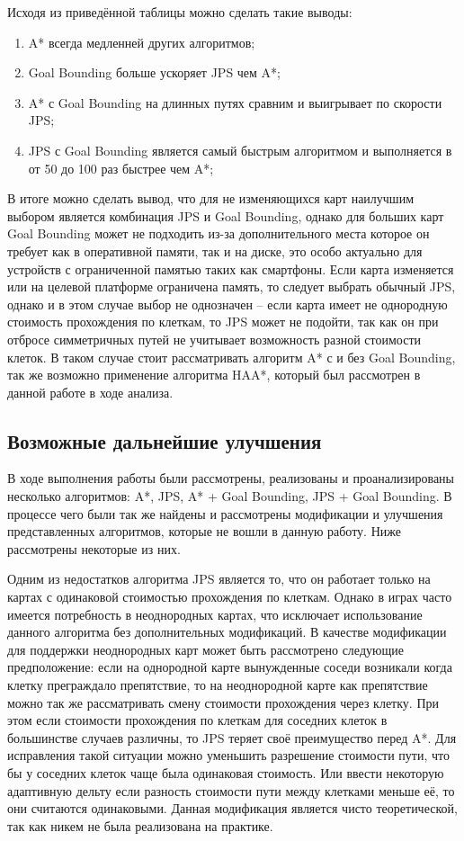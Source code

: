 Исходя из приведённой таблицы можно сделать такие выводы:

\begin{enumerate}
	\item A* всегда медленней других алгоритмов;
	\item Goal Bounding больше ускоряет JPS чем A*;
	\item A* с Goal Bounding на длинных путях сравним и выигрывает по скорости JPS;
	\item JPS с Goal Bounding является самый быстрым алгоритмом и выполняется в от 50 до 100 раз быстрее чем A*; 
\end{enumerate}

В итоге можно сделать вывод, что для не изменяющихся карт наилучшим выбором является комбинация JPS и Goal Bounding, однако для больших карт Goal Bounding может не подходить из-за дополнительного места которое он требует как в оперативной памяти, так и на диске, это особо актуально для устройств с ограниченной памятью таких как смартфоны. Если карта изменяется или на целевой платформе ограничена память, то следует выбрать обычный JPS, однако и в этом случае выбор не однозначен -- если карта имеет не однородную стоимость прохождения по клеткам, то JPS может не подойти, так как он при отбросе симметричных путей не учитывает возможность разной стоимости клеток. В таком случае стоит рассматривать алгоритм A* с и без Goal Bounding, так же возможно применение алгоритма HAA*, который был рассмотрен в данной работе в ходе анализа.  



\subsection{Возможные дальнейшие улучшения}

В ходе выполнения работы были рассмотрены, реализованы и проанализированы несколько алгоритмов: A*, JPS, A* + Goal Bounding, JPS + Goal Bounding. В процессе чего были так же найдены и рассмотрены модификации и улучшения представленных алгоритмов, которые не вошли в данную работу. Ниже рассмотрены некоторые из них.

Одним из недостатков алгоритма JPS является то, что он работает только на картах с одинаковой стоимостью прохождения по клеткам. Однако в играх часто имеется потребность в неоднородных картах, что исключает использование данного алгоритма без дополнительных модификаций. В качестве модификации для поддержки неоднородных карт может быть рассмотрено следующие предположение: если на однородной карте вынужденные соседи возникали когда клетку преграждало препятствие, то на неоднородной карте как препятствие можно так же рассматривать смену стоимости прохождения через клетку. При этом если стоимости прохождения по клеткам для соседних клеток в большинстве случаев различны, то JPS теряет своё преимущество перед A*. Для исправления такой ситуации можно уменьшить разрешение стоимости пути, что бы у соседних клеток чаще была одинаковая стоимость. Или ввести некоторую адаптивную дельту если разность стоимости пути между клетками меньше её, то они считаются одинаковыми. Данная модификация является чисто теоретической, так как никем не была реализована на практике.

